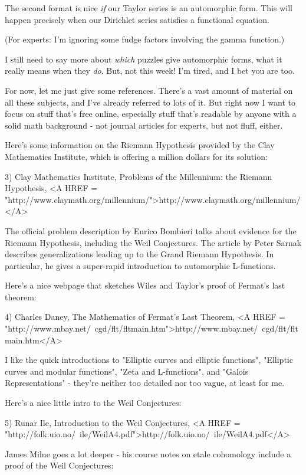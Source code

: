 The second format is nice \emph{if} our Taylor series is an automorphic form.
This will happen precisely when our Dirichlet series satisfies a functional 
equation.

(For experts: I'm ignoring some fudge factors involving the gamma function.)

I still need to say more about \emph{which} puzzles give automorphic forms,
what it really means when they \emph{do}.  But, not this week!  I'm tired, 
and I bet you are too.

For now, let me just give some references.  There's a vast amount of material 
on all these subjects, and I've already referred to lots of it.  But right now 
I want to focus on stuff that's free online, especially stuff that's readable 
by anyone with a solid math background - not journal articles for experts, but 
not fluff, either.

Here's some information on the Riemann Hypothesis provided by the Clay 
Mathematics Institute, which is offering a million dollars for its solution:

3) Clay Mathematics Institute, Problems of the Millennium: 
the Riemann Hypothesis, <A HREF = "http://www.claymath.org/millennium/">http://www.claymath.org/millennium/</A>

The official problem description by Enrico Bombieri talks about evidence 
for the Riemann Hypothesis, including the Weil Conjectures.  The article by 
Peter Sarnak describes generalizations leading up to the Grand Riemann 
Hypothesis.  In particular, he gives a super-rapid introduction to 
automorphic L-functions.

Here's a nice webpage that sketches Wiles and Taylor's proof of Fermat's last 
theorem:

4) Charles Daney, The Mathematics of Fermat's Last Theorem,
<A HREF = "http://www.mbay.net/~cgd/flt/fltmain.htm">http://www.mbay.net/~cgd/flt/fltmain.htm</A>

I like the quick introductions to "Elliptic curves and elliptic functions", 
"Elliptic curves and modular functions", "Zeta and L-functions", and "Galois 
Representations" - they're neither too detailed nor too vague, at least for 
me.  

Here's a nice little intro to the Weil Conjectures:

5) Runar Ile, Introduction to the Weil Conjectures,
<A HREF = "http://folk.uio.no/~ile/WeilA4.pdf">http://folk.uio.no/~ile/WeilA4.pdf</A>

James Milne goes a lot deeper - his course notes on etale cohomology include 
a proof of the Weil Conjectures:

